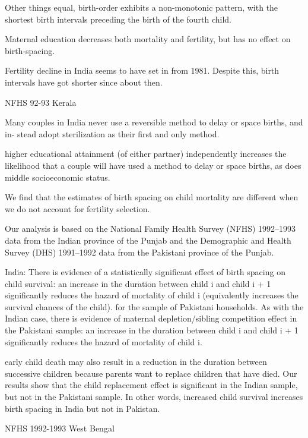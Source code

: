 Other things equal, birth-order exhibits a non-monotonic pattern, with
the shortest birth intervals preceding the birth of the fourth child.

Maternal education decreases both mortality and fertility, but has no
effect on birth-spacing.

Fertility decline in India seems to have set in from 1981. Despite this,
birth intervals have got shorter since about then.

\citep{Zavier2000}

NFHS 92-93 Kerala

Many couples in India never use a reversible method to delay or space births, and in-
stead adopt sterilization as their first and only method.

higher educational attainment (of either partner) independently increases the likelihood 
that a couple will have used a method to delay or space births, as does middle 
socioeconomic status. 

\citep{Maitra2008}

We ﬁnd that the estimates of birth spacing on child mortality are different when we do not account for fertility selection.

Our analysis is based on the National Family Health Survey (NFHS) 1992–1993 data from the Indian province of the Punjab and the Demographic and Health Survey (DHS) 1991–1992 data from the Pakistani province of the Punjab.

India: There is evidence of a statistically signiﬁcant effect of birth spacing on child survival: an increase in the duration between child i and child i + 1 signiﬁcantly reduces the hazard of mortality of child i (equivalently increases the survival chances of the child).
for the sample of Pakistani households. As with the Indian case, there is evidence of maternal depletion/sibling competition effect in the Pakistani sample: an increase in the duration between child i and child i + 1 signiﬁcantly reduces the hazard of mortality of child i.

early child death may also result in a reduction in the duration between successive children because parents want to replace children that have died.
Our results show that the child replacement effect is signiﬁcant in the Indian sample, but not in the Pakistani sample. In other words, increased child survival increases birth spacing in India but not in Pakistan. 

\citep{Makepeace2008}

NFHS 1992-1993 West Bengal

